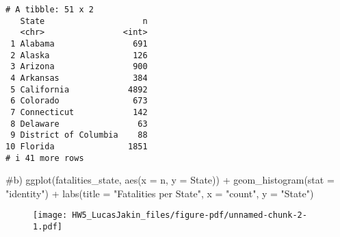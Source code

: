 \documentclass[
  letterpaper,
  DIV=11,
  numbers=noendperiod]{scrartcl}
\newenvironment{Shaded}{\begin{snugshade}}{\end{snugshade}}
\newcommand{\AttributeTok}[1]{\textcolor[rgb]{0.40,0.45,0.13}{#1}}
\newcommand{\CommentTok}[1]{\textcolor[rgb]{0.37,0.37,0.37}{#1}}
\newcommand{\FunctionTok}[1]{\textcolor[rgb]{0.28,0.35,0.67}{#1}}
\newcommand{\NormalTok}[1]{\textcolor[rgb]{0.00,0.23,0.31}{#1}}
\newcommand{\OtherTok}[1]{\textcolor[rgb]{0.00,0.23,0.31}{#1}}
\newcommand{\SpecialCharTok}[1]{\textcolor[rgb]{0.37,0.37,0.37}{#1}}
\newcommand{\StringTok}[1]{\textcolor[rgb]{0.13,0.47,0.30}{#1}}
\begin{document}
\begin{Shaded}
\end{Shaded}

\begin{verbatim}
# A tibble: 51 x 2
   State                    n
   <chr>                <int>
 1 Alabama                691
 2 Alaska                 126
 3 Arizona                900
 4 Arkansas               384
 5 California            4892
 6 Colorado               673
 7 Connecticut            142
 8 Delaware                63
 9 District of Columbia    88
10 Florida               1851
# i 41 more rows
\end{verbatim}

\begin{Shaded}
\begin{Highlighting}[]
\CommentTok{\#b)}
\FunctionTok{ggplot}\NormalTok{(fatalities\_state, }\FunctionTok{aes}\NormalTok{(}\AttributeTok{x =}\NormalTok{ n, }\AttributeTok{y =}\NormalTok{ State)) }\SpecialCharTok{+}
  \FunctionTok{geom\_histogram}\NormalTok{(}\AttributeTok{stat =} \StringTok{"identity"}\NormalTok{) }\SpecialCharTok{+}
  \FunctionTok{labs}\NormalTok{(}\AttributeTok{title =} \StringTok{"Fatalities per State"}\NormalTok{,}
       \AttributeTok{x =} \StringTok{"count"}\NormalTok{,}
       \AttributeTok{y =} \StringTok{"State"}\NormalTok{)}
\end{Highlighting}
\end{Shaded}

\begin{figure}[H]

{\centering \texttt{[image: HW5\_LucasJakin\_files/figure-pdf/unnamed-chunk-2-1.pdf]}

}

\end{figure}
\end{document}

